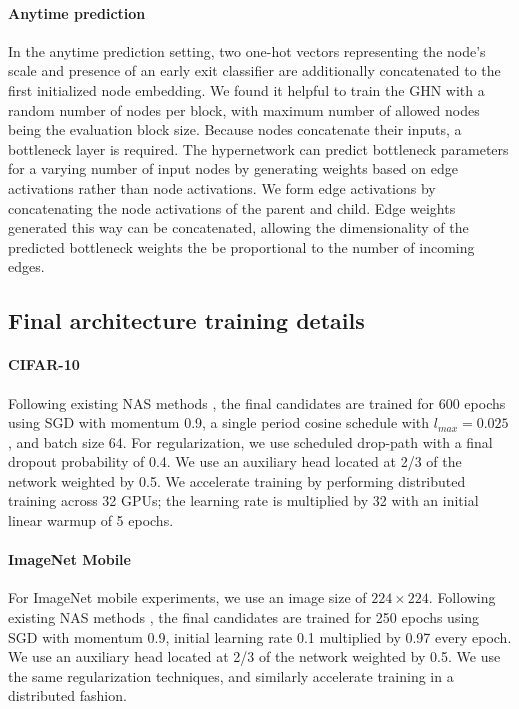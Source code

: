 \documentclass{article} %
\begin{document}
\paragraph{Anytime prediction }
In the anytime prediction setting, two one-hot vectors representing the node's scale and presence of an early exit classifier are additionally concatenated to the first initialized node embedding. We found it helpful to train the GHN with a random number of nodes per block, with maximum number of allowed nodes being the evaluation block size. Because nodes concatenate their inputs, a bottleneck layer is required. The hypernetwork can predict bottleneck parameters for a varying number of input nodes by generating weights based on edge activations rather than node activations. We form edge activations by concatenating the node activations of the parent and child. Edge weights generated this way can be concatenated, allowing the dimensionality of the predicted bottleneck weights the be proportional to the number of incoming edges. 

\subsection{Final architecture training details}\paragraph{CIFAR-10} Following existing NAS methods \citep{zoph2017learning,real2018regularized}, the final candidates are trained for 600 epochs  using  SGD with momentum 0.9,  a single period cosine schedule with $l_{max}=0.025$, and batch size 64. For regularization, we use scheduled drop-path with a final dropout probability of 0.4. We use an auxiliary head located at 2/3 of the network weighted by 0.5. We accelerate training by performing distributed training across 32 GPUs; the learning rate is multiplied by 32 with an initial linear warmup of 5 epochs. 

\paragraph{ImageNet Mobile} For ImageNet mobile experiments, we use an image size of $224\times224$. Following existing NAS methods \citep{zoph2017learning,real2018regularized}, the final candidates are trained for 250 epochs using SGD with momentum 0.9, initial learning rate 0.1 multiplied by 0.97 every epoch. We use an auxiliary head located at 2/3 of the network weighted by 0.5. We use the same regularization techniques, and similarly accelerate training in a distributed fashion. 
\end{document}
